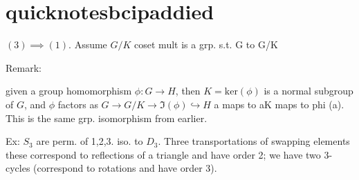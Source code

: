\documentclass{report}
\begin{document}

\section{quicknotesbcipaddied}

\( (3) \implies (1) \). Assume \( G / K \) coset mult is a grp.  s.t. G to G/K 



Remark:

given a group homomorphism \( \phi  : G\to  H \), then \( K=\text{ker}(\phi ) \) is a normal subgroup of \( G \), and \(  \phi  \) factors as \( G \to  G / K \to  \Im(\phi ) \hookrightarrow H \)  a maps to aK maps to phi (a). This is the same grp. isomorphism from earlier. 


Ex: \( S_{3} \) are perm. of 1,2,3. iso. to \( D_{3} \). Three transportations of swapping elements these correspond to reflections of a triangle and have order 2; we have two 3-cycles (correspond to rotations and have order 3). 





\end{document}
